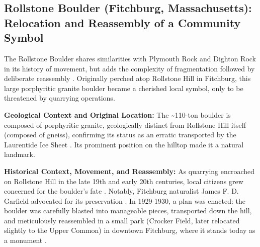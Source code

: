 \subsection{Rollstone Boulder (Fitchburg, Massachusetts): Relocation and Reassembly of a Community Symbol}
\label{subsec:rollstone}

The Rollstone Boulder shares similarities with Plymouth Rock and Dighton Rock in its history of movement, but adds the complexity of fragmentation followed by deliberate reassembly \cite{googleLewistonEvening, telegramWorcesterCounty}. Originally perched atop Rollstone Hill in Fitchburg, this large porphyritic granite boulder became a cherished local symbol, only to be threatened by quarrying operations.

\textbf{Geological Context and Original Location:} The \textasciitilde110-ton boulder is composed of porphyritic granite, geologically distinct from Rollstone Hill itself (composed of gneiss), confirming its status as an erratic transported by the Laurentide Ice Sheet \cite{mindatMineralsRollstone, Hitchcock1841}. Its prominent position on the hilltop made it a natural landmark.

\textbf{Historical Context, Movement, and Reassembly:} As quarrying encroached on Rollstone Hill in the late 19th and early 20th centuries, local citizens grew concerned for the boulder's fate \cite{googleLewistonEvening, telegramWorcesterCounty}. Notably, Fitchburg naturalist James F. D. Garfield advocated for its preservation \cite{googleLewistonEvening}. In 1929-1930, a plan was enacted: the boulder was carefully blasted into manageable pieces, transported down the hill, and meticulously reassembled in a small park (Crocker Field, later relocated slightly to the Upper Common) in downtown Fitchburg, where it stands today as a monument \cite{googleLewistonEvening, telegramWorcesterCounty}.

